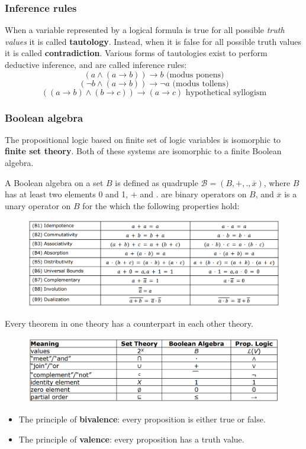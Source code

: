 \documentclass{article}
\begin{document}
\subsubsection{Inference rules}
When a variable represented by a logical formula is true for all possible \textit{truth values}
it is called \textbf{tautology}. Instead, when it is false for all possible truth values it is
called \textbf{contradiction}.
\newline\newline
Various forms of tautologies exist to perform deductive inference, and are called inference rules:
$$(a\land (a\rightarrow b))\rightarrow b\text{ (modus ponens)}$$
$$(\lnot b \land (a\rightarrow b))\rightarrow \lnot a\text{ (modus tollens)}$$
$$((a\rightarrow b)\land (b\rightarrow c))\rightarrow (a\rightarrow c)\text{ hypothetical syllogism}$$

\subsubsection{Boolean algebra}
The propositional logic based on finite set of logic variables is isomorphic to \textbf{finite
    set theory}. Both of these systems are isomorphic to a finite Boolean algebra.

A Boolean algebra on a set $B$ is defined as quadruple $\mathcal{B}=(B,+,.,\overline{x})$, where
$B$ has at least two elements 0 and 1, $+$ and $.$ are binary operators on $B$, and $\overline{x}$
is a unary operator on $B$ for the which the following properties hold:
\begin{figure}[H]
    \centering
    \includegraphics[scale=0.35]{images/bool-prop.png}
\end{figure}
Every theorem in one theory has a counterpart in each other theory.
\begin{figure}[H]
    \centering
    \includegraphics[scale=0.35]{images/bool-counter.png}
\end{figure}
\begin{itemize}
    \item The principle of \textbf{bivalence}: every proposition is either true or false.
    \item The principle of \textbf{valence}: every proposition has a truth value.
\end{itemize}
\end{document}
